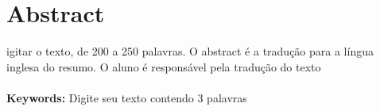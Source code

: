 \section*{Abstract}
igitar o texto, de 200 a 250 palavras. O abstract é a tradução para a língua inglesa do resumo. O aluno é responsável pela tradução do texto \\ \\
\textbf{Keywords:} Digite seu texto contendo 3 palavras
